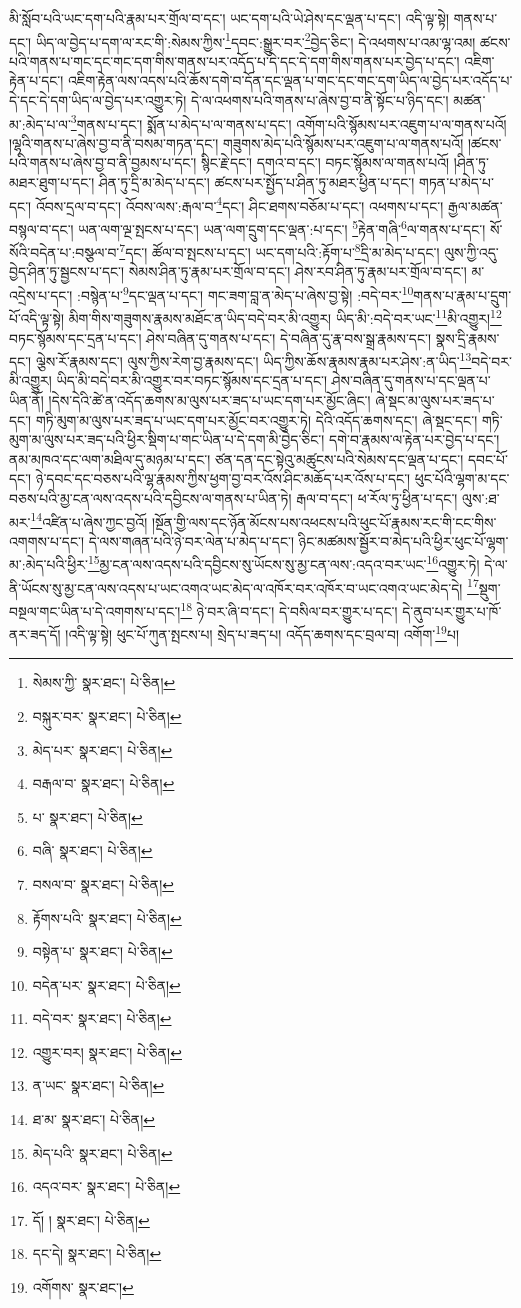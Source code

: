 མི་སློབ་པའི་ཡང་དག་པའི་རྣམ་པར་གྲོལ་བ་དང་། ཡང་དག་པའི་ཡེ་ཤེས་དང་ལྡན་པ་དང་། འདི་ལྟ་སྟེ། གནས་པ་དང་། ཡིད་ལ་བྱེད་པ་དག་ལ་རང་གི་:སེམས་ཀྱིས་\footnote{སེམས་ཀྱི་  སྣར་ཐང་།  པེ་ཅིན། }དབང་:སྒྱུར་བར་\footnote{བསྐུར་བར་  སྣར་ཐང་།  པེ་ཅིན། }བྱེད་ཅིང་། དེ་འཕགས་པ་འམ་ལྷ་འམ། ཚངས་པའི་གནས་པ་གང་དང་གང་དག་གིས་གནས་པར་འདོད་པ་དེ་དང་དེ་དག་གིས་གནས་པར་བྱེད་པ་དང་། འཇིག་རྟེན་པ་དང་། འཇིག་རྟེན་ལས་འདས་པའི་ཆོས་དགེ་བ་དོན་དང་ལྡན་པ་གང་དང་གང་དག་ཡིད་ལ་བྱེད་པར་འདོད་པ་དེ་དང་དེ་དག་ཡིད་ལ་བྱེད་པར་འགྱུར་ཏེ། དེ་ལ་འཕགས་པའི་གནས་པ་ཞེས་བྱ་བ་ནི་སྟོང་པ་ཉིད་དང་། མཚན་མ་:མེད་པ་ལ་\footnote{མེད་པར་  སྣར་ཐང་།  པེ་ཅིན། }གནས་པ་དང་། སྨོན་པ་མེད་པ་ལ་གནས་པ་དང་། འགོག་པའི་སྙོམས་པར་འཇུག་པ་ལ་གནས་པའོ། །ལྷའི་གནས་པ་ཞེས་བྱ་བ་ནི་བསམ་གཏན་དང་། གཟུགས་མེད་པའི་སྙོམས་པར་འཇུག་པ་ལ་གནས་པའོ། །ཚངས་པའི་གནས་པ་ཞེས་བྱ་བ་ནི་བྱམས་པ་དང་། སྙིང་རྗེ་དང་། དགའ་བ་དང་། བཏང་སྙོམས་ལ་གནས་པའོ། །ཤིན་ཏུ་མཐར་ཐུག་པ་དང་། ཤིན་ཏུ་དྲི་མ་མེད་པ་དང་། ཚངས་པར་སྤྱོད་པ་ཤིན་ཏུ་མཐར་ཕྱིན་པ་དང་། གཏན་པ་མེད་པ་དང་། འོབས་དྲལ་བ་དང་། འོབས་ལས་:རྒལ་བ་\footnote{བརྒལ་བ་  སྣར་ཐང་།  པེ་ཅིན། }དང་། ཤིང་ཐགས་བཅོམ་པ་དང་། འཕགས་པ་དང་། རྒྱལ་མཚན་བསྙལ་བ་དང་། ཡན་ལག་ལྔ་སྤངས་པ་དང་། ཡན་ལག་དྲུག་དང་ལྡན་:པ་དང་། \footnote{པ་  སྣར་ཐང་།  པེ་ཅིན། }རྟེན་གཞི་\footnote{བཞི་  སྣར་ཐང་།  པེ་ཅིན། }ལ་གནས་པ་དང་། སོ་སོའི་བདེན་པ་:བསྩལ་བ་\footnote{བསལ་བ་  སྣར་ཐང་།  པེ་ཅིན། }དང་། ཚོལ་བ་སྤངས་པ་དང་། ཡང་དག་པའི་:རྟོག་པ་\footnote{རྟོགས་པའི་  སྣར་ཐང་།  པེ་ཅིན། }དྲི་མ་མེད་པ་དང་། ལུས་ཀྱི་འདུ་བྱེད་ཤིན་ཏུ་སྦྱངས་པ་དང་། སེམས་ཤིན་ཏུ་རྣམ་པར་གྲོལ་བ་དང་། ཤེས་རབ་ཤིན་ཏུ་རྣམ་པར་གྲོལ་བ་དང་། མ་འདྲེས་པ་དང་། :བསྙེན་པ་\footnote{བསྟེན་པ་  སྣར་ཐང་།  པེ་ཅིན། }དང་ལྡན་པ་དང་། གང་ཟག་བླ་ན་མེད་པ་ཞེས་བྱ་སྟེ། :བདེ་བར་\footnote{བདེན་པར་  སྣར་ཐང་།  པེ་ཅིན། }གནས་པ་རྣམ་པ་དྲུག་པོ་འདི་ལྟ་སྟེ། མིག་གིས་གཟུགས་རྣམས་མཐོང་ན་ཡིད་བདེ་བར་མི་འགྱུར། ཡིད་མི་:བདེ་བར་ཡང་\footnote{བདེ་བར་  སྣར་ཐང་།  པེ་ཅིན། }མི་འགྱུར།\footnote{འགྱུར་བར།  སྣར་ཐང་།  པེ་ཅིན། } བཏང་སྙོམས་དང་དྲན་པ་དང་། ཤེས་བཞིན་དུ་གནས་པ་དང་། དེ་བཞིན་དུ་རྣ་བས་སྒྲ་རྣམས་དང་། སྣས་དྲི་རྣམས་དང་། ལྕེས་རོ་རྣམས་དང་། ལུས་ཀྱིས་རེག་བྱ་རྣམས་དང་། ཡིད་ཀྱིས་ཆོས་རྣམས་རྣམ་པར་ཤེས་:ན་ཡིད་\footnote{ན་ཡང་  སྣར་ཐང་།  པེ་ཅིན། }བདེ་བར་མི་འགྱུར། ཡིད་མི་བདེ་བར་མི་འགྱུར་བར་བཏང་སྙོམས་དང་དྲན་པ་དང་། ཤེས་བཞིན་དུ་གནས་པ་དང་ལྡན་པ་ཡིན་ནོ། །དེས་དེའི་ཚེ་ན་འདོད་ཆགས་མ་ལུས་པར་ཟད་པ་ཡང་དག་པར་མྱོང་ཞིང་། ཞེ་སྡང་མ་ལུས་པར་ཟད་པ་དང་། གཏི་མུག་མ་ལུས་པར་ཟད་པ་ཡང་དག་པར་མྱོང་བར་འགྱུར་ཏེ། དེའི་འདོད་ཆགས་དང་། ཞེ་སྡང་དང་། གཏི་མུག་མ་ལུས་པར་ཟད་པའི་ཕྱིར་སྡིག་པ་གང་ཡིན་པ་དེ་དག་མི་བྱེད་ཅིང་། དགེ་བ་རྣམས་ལ་རྟེན་པར་བྱེད་པ་དང་། ནམ་མཁའ་དང་ལག་མཐིལ་དུ་མཉམ་པ་དང་། ཙན་དན་དང་སྟེའུ་མཚུངས་པའི་སེམས་དང་ལྡན་པ་དང་། དབང་པོ་དང་། ཉེ་དབང་དང་བཅས་པའི་ལྷ་རྣམས་ཀྱིས་ཕྱག་བྱ་བར་འོས་ཤིང་མཆོད་པར་འོས་པ་དང་། ཕུང་པོའི་ལྷག་མ་དང་བཅས་པའི་མྱ་ངན་ལས་འདས་པའི་དབྱིངས་ལ་གནས་པ་ཡིན་ཏེ། རྒལ་བ་དང་། ཕ་རོལ་ཏུ་ཕྱིན་པ་དང་། ལུས་:ཐ་མར་\footnote{ཐ་མ་  སྣར་ཐང་།  པེ་ཅིན། }འཛིན་པ་ཞེས་ཀྱང་བྱའོ། །སྔོན་གྱི་ལས་དང་ཉོན་མོངས་པས་འཕངས་པའི་ཕུང་པོ་རྣམས་རང་གི་ངང་གིས་འགགས་པ་དང་། དེ་ལས་གཞན་པའི་ཉེ་བར་ལེན་པ་མེད་པ་དང་། ཉིང་མཚམས་སྦྱོར་བ་མེད་པའི་ཕྱིར་ཕུང་པོ་ལྷག་མ་:མེད་པའི་ཕྱིར་\footnote{མེད་པའི་  སྣར་ཐང་།  པེ་ཅིན། }མྱ་ངན་ལས་འདས་པའི་དབྱིངས་སུ་ཡོངས་སུ་མྱ་ངན་ལས་:འདའ་བར་ཡང་\footnote{འདའ་བར་  སྣར་ཐང་།  པེ་ཅིན། }འགྱུར་ཏེ། དེ་ལ་ནི་ཡོངས་སུ་མྱ་ངན་ལས་འདས་པ་ཡང་འགའ་ཡང་མེད་ལ་འཁོར་བར་འཁོར་བ་ཡང་འགའ་ཡང་མེད་དེ། \footnote{དོ། །   སྣར་ཐང་།  པེ་ཅིན། }སྡུག་བསྔལ་གང་ཡིན་པ་དེ་འགགས་པ་དང་།\footnote{དང་དེ།  སྣར་ཐང་།  པེ་ཅིན། } ཉེ་བར་ཞི་བ་དང་། དེ་བསིལ་བར་གྱུར་པ་དང་། དེ་ནུབ་པར་གྱུར་པ་ཁོ་ནར་ཟད་དོ། །འདི་ལྟ་སྟེ། ཕུང་པོ་ཀུན་སྤངས་པ། སྲེད་པ་ཟད་པ། འདོད་ཆགས་དང་བྲལ་བ། འགོག་\footnote{འགོགས་  སྣར་ཐང་། }པ། 